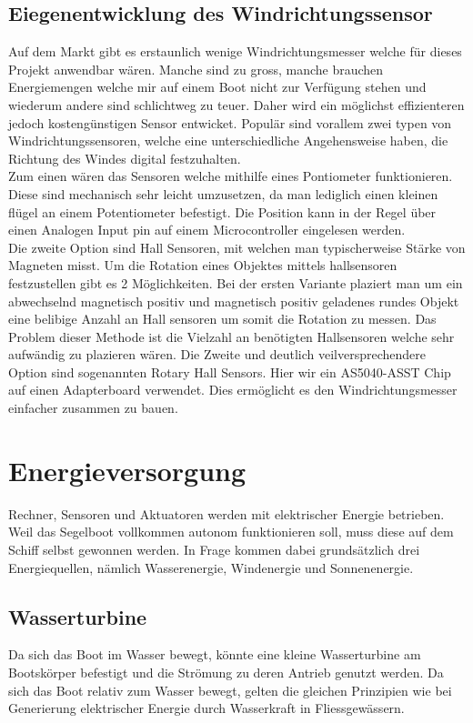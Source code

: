 \subsection{Eiegenentwicklung des Windrichtungssensor}
Auf dem Markt gibt es erstaunlich wenige Windrichtungsmesser welche für dieses Projekt anwendbar wären. Manche sind zu gross, manche brauchen Energiemengen welche mir auf einem Boot nicht zur Verfügung stehen und wiederum andere sind schlichtweg zu teuer. Daher wird ein möglichst effizienteren jedoch kostengünstigen Sensor entwicket.
Populär sind vorallem zwei typen von Windrichtungssensoren, welche eine unterschiedliche Angehensweise haben, die Richtung des Windes digital festzuhalten. \\
Zum einen wären das Sensoren welche mithilfe eines Pontiometer funktionieren. Diese sind mechanisch sehr leicht umzusetzen, da man lediglich einen kleinen flügel an einem Potentiometer befestigt. Die Position kann in der Regel über einen Analogen Input pin auf einem Microcontroller eingelesen werden.
\\
Die zweite Option sind Hall Sensoren, mit welchen man typischerweise Stärke von Magneten misst. Um die Rotation eines Objektes mittels hallsensoren festzustellen gibt es 2 Möglichkeiten. Bei der ersten Variante plaziert man um ein abwechselnd magnetisch positiv und magnetisch positiv geladenes rundes Objekt eine belibige Anzahl an Hall sensoren um somit die Rotation zu messen. Das Problem dieser Methode ist die Vielzahl an benötigten Hallsensoren welche sehr aufwändig zu plazieren wären. Die Zweite und deutlich veilversprechendere Option sind sogenannten Rotary Hall Sensors. Hier wir ein AS5040-ASST Chip auf einen Adapterboard verwendet. Dies ermöglicht es den Windrichtungsmesser einfacher zusammen zu bauen.


\section{Energieversorgung}

Rechner, Sensoren und Aktuatoren werden mit elektrischer Energie betrieben. Weil das Segelboot vollkommen autonom funktionieren soll, muss diese auf dem Schiff selbst gewonnen werden. In Frage kommen dabei grundsätzlich drei Energiequellen, nämlich Wasserenergie, Windenergie und Sonnenenergie. 

\subsection{Wasserturbine}
Da sich das Boot im Wasser bewegt, könnte eine kleine Wasserturbine am Bootskörper befestigt und die Strömung zu deren Antrieb genutzt werden. Da sich das Boot relativ zum Wasser bewegt, gelten die gleichen Prinzipien wie bei Generierung elektrischer Energie durch Wasserkraft in Fliessgewässern.

